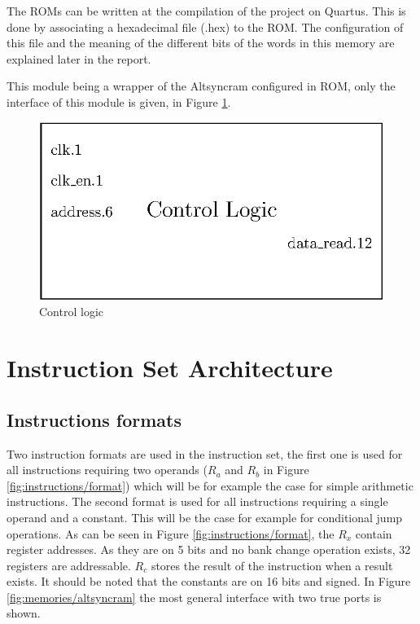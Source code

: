 The ROMs can be written at the compilation of the project on Quartus. This is done by associating a
hexadecimal file (.hex) to the ROM. The configuration of this file and the meaning of the different 
bits of the words in this memory are explained later in the report. 

This module being a wrapper of the Altsyncram configured in ROM, only the interface of this 
module is given, in Figure \ref{fig:components/cl}.

\begin{figure}[H]
    \centering
    \includegraphics[scale=1]{Chapter3-CPU/res/control_logic}
    \caption{Control logic}
    \label{fig:components/cl}
\end{figure}

\section{Instruction Set Architecture}
\subsection{Instructions formats}

Two instruction formats are used in the instruction set, the first one is used for all instructions 
requiring two operands ($R_a$ and $R_b$ in Figure \ref{fig:instructions/format}) which will be for example 
the case for simple arithmetic instructions. The second format is used for all instructions 
requiring a single operand and a constant. This will be the case for example for conditional jump 
operations. As can be seen in Figure \ref{fig:instructions/format}, the $R_x$ contain register 
addresses. As they are on 5 bits and no bank change operation exists, 32 registers are addressable. 
$R_c$ stores the result of the instruction when a result exists. It should be noted that the 
constants are on 16 bits and signed. In Figure \ref{fig:memories/altsyncram} the most general interface 
with two true ports is shown. 


